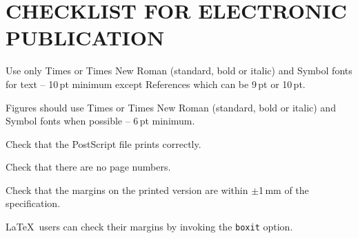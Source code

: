 \section{CHECKLIST FOR ELECTRONIC PUBLICATION}

\begin{Itemize}
    \item  Use only Times or Times New Roman (standard, bold or italic) and Symbol 
    			fonts for text -- 10\,pt minimum except References which can be 9\,pt or 10\,pt.
    \item  Figures should use Times or Times New Roman (standard, bold or italic) and Symbol fonts when possible
            -- 6\,pt minimum.
    \item  Check that the PostScript file prints correctly.
    \item  Check that there are no page numbers.
    \item  Check that the margins on the printed version are within $\pm$1\,mm of the specification.
    \item  \LaTeX\ users can check their margins by invoking the
           \texttt{boxit} option.
\end{Itemize}


